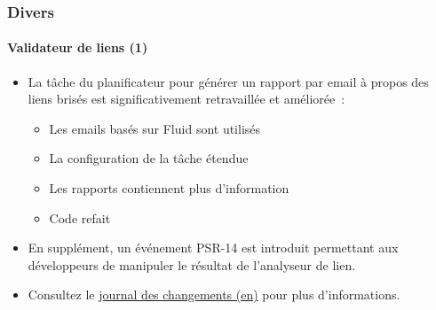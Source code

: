%

\begin{frame}[fragile]
	\frametitle{Divers}
	\framesubtitle{Validateur de liens (1)}


	\begin{itemize}
		\item La tâche du planificateur pour générer un rapport par email à propos des
			liens brisés est significativement retravaillée et améliorée~:

			\begin{itemize}
				\item Les emails basés sur Fluid sont utilisés
				\item La configuration de la tâche étendue
				\item Les rapports contiennent plus d'information
				\item Code refait
			\end{itemize}

		\item En supplément, un événement PSR-14 est introduit permettant aux développeurs
			de manipuler le résultat de l'analyseur de lien.

		\item Consultez le \href{https://docs.typo3.org/c/typo3/cms-core/master/en-us/Changelog/11.0/Feature-29342-ImproveValidatorTask.html}{journal des changements (en)}
			pour plus d'informations.

	\end{itemize}

\end{frame}

